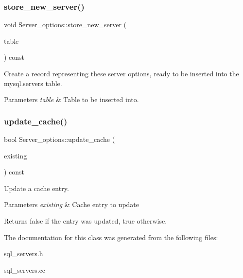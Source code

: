 \subsubsection{\texorpdfstring{store\+\_\+new\+\_\+server()}{store\_new\_server()}}
{\footnotesize\ttfamily void Server\+\_\+options\+::store\+\_\+new\+\_\+server (\begin{DoxyParamCaption}\item[{\mbox{\hyperlink{structTABLE}{T\+A\+B\+LE}} $\ast$}]{table }\end{DoxyParamCaption}) const}

Create a record representing these server options, ready to be inserted into the mysql.\+servers table.


\begin{DoxyParams}{Parameters}
{\em table} & Table to be inserted into. \\
\hline
\end{DoxyParams}
\mbox{\label{classServer__options_ad909bd31eac07257d93061cdf04a265f}} 
\subsubsection{\texorpdfstring{update\+\_\+cache()}{update\_cache()}}
{\footnotesize\ttfamily bool Server\+\_\+options\+::update\+\_\+cache (\begin{DoxyParamCaption}\item[{\mbox{\hyperlink{classFOREIGN__SERVER}{F\+O\+R\+E\+I\+G\+N\+\_\+\+S\+E\+R\+V\+ER}} $\ast$}]{existing }\end{DoxyParamCaption}) const}

Update a cache entry.


\begin{DoxyParams}{Parameters}
{\em existing} & Cache entry to update\\
\hline
\end{DoxyParams}
\begin{DoxyReturn}{Returns}
false if the entry was updated, true otherwise. 
\end{DoxyReturn}


The documentation for this class was generated from the following files\+:\begin{DoxyCompactItemize}
\item 
sql\+\_\+servers.\+h\item 
sql\+\_\+servers.\+cc\end{DoxyCompactItemize}
